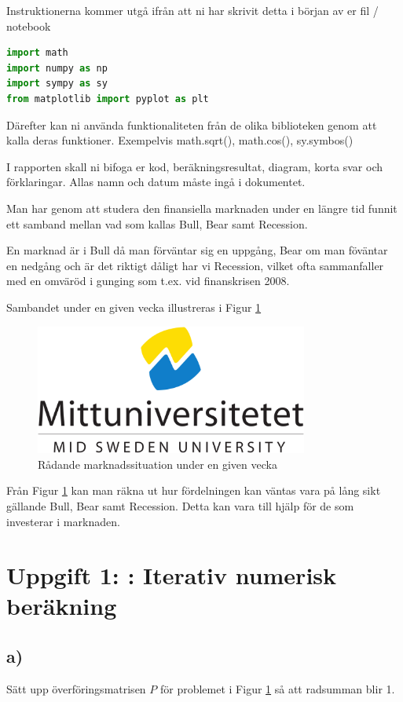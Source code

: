 \documentclass[a4paper]{article}
\begin{document}
Instruktionerna kommer utgå ifrån att ni har skrivit detta i början av er fil / notebook
\begin{lstlisting}[language=Python]
import math 
import numpy as np
import sympy as sy
from matplotlib import pyplot as plt
\end{lstlisting}

Därefter kan ni använda funktionaliteten från de olika biblioteken genom att
kalla deras funktioner. Exempelvis math.sqrt(), math.cos(), sy.symbos()

I rapporten skall ni bifoga er kod, beräkningsresultat, diagram, korta svar och förklaringar.
Allas namn och datum måste ingå i dokumentet.

\newpage
Man har genom att studera den finansiella marknaden under en längre tid funnit ett samband mellan vad som kallas Bull, Bear samt Recession.

En marknad är i Bull då man förväntar sig en uppgång, Bear om man föväntar en nedgång och är det riktigt dåligt har vi Recession, vilket ofta sammanfaller
med en omväröd i gunging som t.ex. vid finanskrisen 2008.

Sambandet under en given vecka illustreras i Figur \ref{fig:bbr}

\begin{figure}[H]
  \centering
  \includegraphics[width=0.8\textwidth]{msu.png}
  \caption{Rådande marknadssituation under en given vecka}
  \label{fig:bbr}
\end{figure}

Från Figur \ref{fig:bbr} kan man räkna ut hur fördelningen kan väntas vara på lång sikt gällande Bull, Bear samt Recession.
Detta kan vara till hjälp för de som investerar i marknaden.

\section{Uppgift 1: : Iterativ numerisk beräkning}
\subsection{a)}
Sätt upp överföringsmatrisen \( P \) för problemet i Figur \ref{fig:bbr} så att radsumman blir 1.
\end{document}
